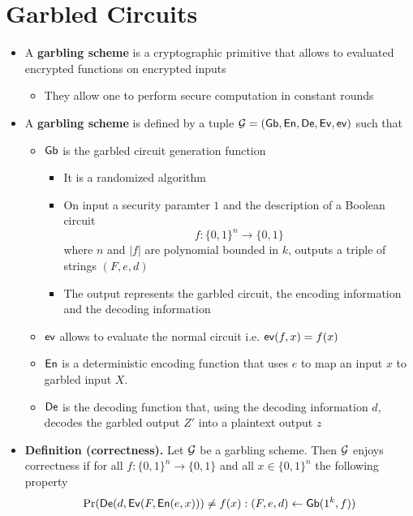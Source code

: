 \section{Garbled Circuits}
\begin{itemize}
    \item A \textbf{garbling scheme} is a cryptographic primitive that allows to evaluated encrypted functions on encrypted inputs
    \begin{itemize}
        \item They allow one to perform secure computation in constant rounds
    \end{itemize}
    \item A \textbf{garbling scheme} is defined by a tuple $\mathcal G = (\mathsf{Gb}, \mathsf{En}, \mathsf{De}, \mathsf{Ev}, \mathsf{ev})$ such that
    \begin{itemize}
        \item $\mathsf{Gb}$ is the garbled circuit generation function
        \begin{itemize}
            \item It is a randomized algorithm
            \item On input a security paramter $1$ and the description of a Boolean circuit
            \begin{equation*}
                f: \{0,1\}^n \to \{0,1\}
            \end{equation*}
            where $n$ and $|f|$ are polynomial bounded in $k$, outputs a triple of strings $(F,e,d)$
            \item The output represents the garbled circuit, the encoding information and the decoding information
        \end{itemize}
        \item $\mathsf{ev}$ allows to evaluate the normal circuit i.e. $\mathsf{ev}(f,x) = f(x)$
        \item $\mathsf{En}$ is a deterministic encoding function that uses $e$ to map an input $x$ to garbled input $X$. 
        \item $\mathsf{De}$ is the decoding function that, using the decoding information $d$, decodes the garbled output $Z'$ into a plaintext output $z$
    \end{itemize}
    \item \textbf{Definition (correctness).} Let $\mathcal G$ be a garbling scheme. Then $\mathcal G$ enjoys correctness if for all $f: \{0,1\}^n \to \{0,1\}$ and all $x \in \{0,1\}^n$ the following property
    \begin{equation*}
        \Pr(\De(d, \Ev(F, \En(e, x))) \neq f(x) : (F, e, d) \leftarrow \Gb(1^k, f))

\end{equation*}
\end{itemize}
